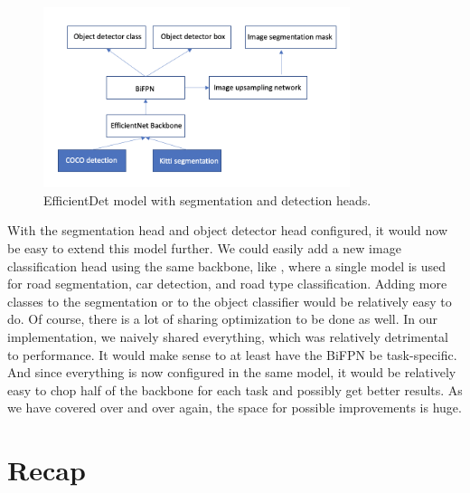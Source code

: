 \begin{figure}[h!] 
    \centering 
    \includegraphics[width=0.8\textwidth]{imgs/efficientdet-multi.png}
    \caption{EfficientDet model with segmentation and detection heads.}
\end{figure}

With the segmentation head and object detector head configured, it would now be easy to extend this model further.
We could easily add a new image classification head using the same backbone, like \citep{multinet}, where a single model is used for road segmentation, car detection, and road type classification.
Adding more classes to the segmentation or to the object classifier would be relatively easy to do.
Of course, there is a lot of sharing optimization to be done as well.
In our implementation, we naively shared everything, which was relatively detrimental to performance.
It would make sense to at least have the BiFPN be task-specific.
And since everything is now configured in the same model, it would be relatively easy to chop half of the backbone for each task and possibly get better results.
As we have covered over and over again, the space for possible improvements is huge.

\section{Recap}
